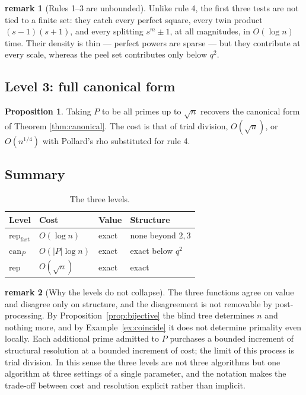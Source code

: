 \documentclass[11pt]{article}
\theoremstyle{definition}
\newtheorem{proposition}{Proposition}
\newtheorem{remark}{remark}
\begin{document}
\begin{remark}[Rules 1--3 are unbounded]
Unlike rule 4, the first three tests are not tied to a finite set: they catch
every perfect square, every twin product $(s-1)(s+1)$, and every splitting
$s^m \pm 1$, at all magnitudes, in $O(\log n)$ time. Their density is thin ---
perfect powers are sparse --- but they contribute at every scale, whereas the
peel set contributes only below $q^2$.
\end{remark}

\subsection{Level 3: full canonical form}

\begin{proposition}
Taking $P$ to be all primes up to $\sqrt{n}$ recovers the canonical form of
Theorem \ref{thm:canonical}. The cost is that of trial division, $O(\sqrt{n})$,
or $O(n^{1/4})$ with Pollard's rho substituted for rule 4.
\end{proposition}

\subsection{Summary}

\begin{table}[htbp]
\centering
\caption{The three levels.}
\begin{tabular}{llll}
\hline
Level & Cost & Value & Structure \\
\hline
$\mathrm{rep}_{\mathrm{fast}}$ & $O(\log n)$        & exact & none beyond $2,3$ \\
$\mathrm{can}_P$               & $O(|P| \log n)$    & exact & exact below $q^2$ \\
$\mathrm{rep}$                 & $O(\sqrt{n})$      & exact & exact \\
\hline
\end{tabular}
\end{table}

\begin{remark}[Why the levels do not collapse]
The three functions agree on value and disagree only on structure, and the
disagreement is not removable by post-processing. By
Proposition~\ref{prop:bijective} the blind tree determines $n$ and nothing
more, and by Example~\ref{ex:coincide} it does not determine primality even
locally. Each additional prime admitted to $P$ purchases a bounded increment
of structural resolution at a bounded increment of cost; the limit of this
process is trial division. In this sense the three levels are not three
algorithms but one algorithm at three settings of a single parameter, and the
notation makes the trade-off between cost and resolution explicit rather than
implicit.
\end{remark}
\end{document}
